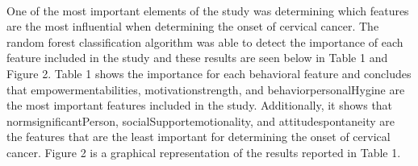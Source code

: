 \documentclass[10pt, oneside, twocolumn]{article}
\begin{document}
\paragraph{} 
One of the most important elements of the study was determining which features are the most influential when determining the onset of cervical cancer. The random forest classification algorithm was able to detect the importance of each feature included in the study and these results are seen below in Table 1 and Figure 2. Table 1 shows the importance for each behavioral feature and concludes that empowerment\textunderscore abilities, motivation\textunderscore strength, and behavior\textunderscore personalHygine are the most important features included in the study. Additionally, it shows that norm\textunderscore significantPerson, socialSupport\textunderscore emotionality, and attitude\textunderscore spontaneity are the features that are the least important for determining the onset of cervical cancer. Figure 2 is a graphical representation of the results reported in Table 1. 
\end{document}
